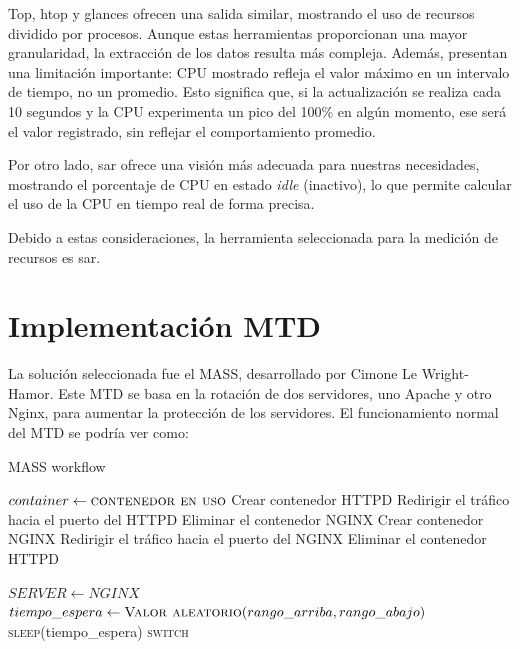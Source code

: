 Top, htop y glances ofrecen una salida similar, mostrando el uso de recursos dividido por procesos. Aunque estas herramientas proporcionan una mayor granularidad, la extracción de los datos resulta más compleja. Además, presentan una limitación importante: CPU mostrado refleja el valor máximo en un intervalo de tiempo, no un promedio. Esto significa que, si la actualización se realiza cada 10 segundos y la CPU experimenta un pico del 100\% en algún momento, ese será el valor registrado, sin reflejar el comportamiento promedio.

Por otro lado, sar ofrece una visión más adecuada para nuestras necesidades, mostrando el porcentaje de CPU en estado \textit{idle} (inactivo), lo que permite calcular el uso de la CPU en tiempo real de forma precisa.

Debido a estas consideraciones, la herramienta seleccionada para la medición de recursos es sar.


\section{Implementación MTD}
La solución seleccionada fue el MASS, desarrollado por Cimone Le Wright-Hamor. Este MTD se basa en la rotación de dos servidores, uno Apache y otro Nginx, para aumentar la protección de los servidores. El funcionamiento normal del MTD se podría ver como:

\begin{algorithm}
\caption{MASS workflow}\label{mass:algorithm}
    \begin{algorithmic}[1]
            \State $container \gets \textsc{contenedor en uso}$
                \State Crear contenedor HTTPD
                \State Redirigir el tráfico hacia el puerto del HTTPD
                \State Eliminar el contenedor NGINX
            \Else
                    \State Crear contenedor NGINX
                    \State Redirigir el tráfico hacia el puerto del NGINX
                    \State Eliminar el contenedor HTTPD
                \EndIf
            \EndIf
        \EndFunction

            \State $SERVER \gets NGINX$
                \State $tiempo\_espera \gets \textsc{Valor aleatorio}(rango\_arriba , rango\_abajo)$
                \State \textsc{sleep}(tiempo\_espera)
                \State \textsc{switch}
            \EndWhile
        \EndFunction
    \end{algorithmic}
\end{algorithm}

